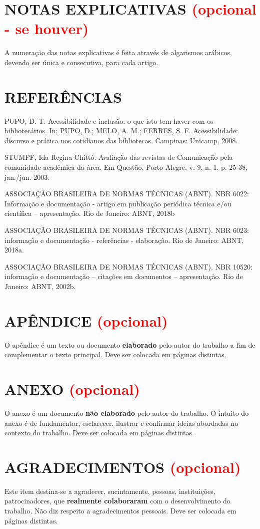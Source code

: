\documentclass[12pt]{article}
\begin{document}
\section*{NOTAS EXPLICATIVAS \textcolor{red}{(opcional - se houver)}}
A numeração das notas explicativas é feita através de algarismos arábicos, devendo ser única e consecutiva, para cada artigo.

\section*{REFERÊNCIAS}
PUPO, D. T. Acessibilidade e inclusão: o que isto tem haver com os bibliotecários. In: PUPO, D.; MELO, A. M.; FERRES, S. F. Acessibilidade: discurso e prática nos cotidianos das bibliotecas. Campinas: Unicamp, 2008.

STUMPF, Ida Regina Chittó. Avaliação das revistas de Comunicação pela comunidade acadêmica da área. Em Questão, Porto Alegre, v. 9, n. 1, p. 25-38, jan./jun. 2003.

ASSOCIAÇÃO BRASILEIRA DE NORMAS TÉCNICAS (ABNT). NBR 6022: Informação e documentação - artigo em publicação periódica técnica e/ou científica – apresentação. Rio de Janeiro: ABNT, 2018b

ASSOCIAÇÃO BRASILEIRA DE NORMAS TÉCNICAS (ABNT). NBR 6023: informação e documentação - referências - elaboração. Rio de Janeiro: ABNT, 2018a.

ASSOCIAÇÃO BRASILEIRA DE NORMAS TÉCNICAS (ABNT). NBR 10520: informação e documentação – citações em documentos – apresentação. Rio de Janeiro: ABNT, 2002b.


\section*{APÊNDICE \textcolor{red}{(opcional)}}
O apêndice é um texto ou documento \textbf{elaborado} pelo autor do trabalho a fim de complementar o texto principal. Deve ser colocada em páginas distintas.

\section*{ANEXO \textcolor{red}{(opcional)}}
O anexo é um documento \textbf{não elaborado} pelo autor do trabalho. O intuito do anexo é de fundamentar, esclarecer, ilustrar e confirmar ideias abordadas no contexto do trabalho. Deve ser colocada em páginas distintas.


\section*{AGRADECIMENTOS \textcolor{red}{(opcional)}}
Este item destina-se a agradecer, sucintamente, pessoas, instituições, patrocinadores, que \textbf{realmente colaboraram} com o desenvolvimento do trabalho. Não diz respeito a agradecimentos pessoais. Deve ser colocada em páginas distintas.


\newpage

%

\end{document}
